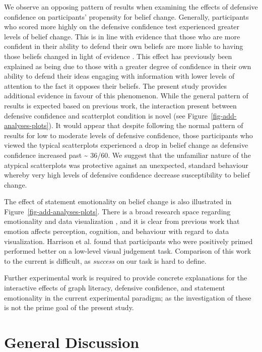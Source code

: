 \documentclass[manuscript,screen,review,anonymous]{acmart}
\begin{document}
We observe an opposing pattern of results when examining the effects of
defensive confidence on participants' propensity for belief change.
Generally, participants who scored more highly on the defensive
confidence test experienced greater levels of belief change. This is in
line with evidence that those who are more confident in their ability to
defend their own beliefs are more liable to having those beliefs changed
in light of evidence \citep{albarracin_2004}. This effect has previously
been explained as being due to those with a greater degree of confidence
in their own ability to defend their ideas engaging with information
with lower levels of attention to the fact it opposes their beliefs. The
present study provides additional evidence in favour of this phenomenon.
While the general pattern of results is expected based on previous work,
the interaction present between defensive confidence and scatterplot
condition is novel (see Figure~\ref{fig-add-analyses-plots}). It would
appear that despite following the normal pattern of results for low to
moderate levels of defensive confidence, those participants who viewed
the typical scatterplots experienced a drop in belief change as
defensive confidence increased past \textasciitilde{} 36/60. We suggest
that the unfamiliar nature of the atypical scatterplots was protective
against an unexpected, standard behaviour whereby very high levels of
defensive confidence decrease susceptibility to belief change.

The effect of statement emotionality on belief change is also
illustrated in Figure~\ref{fig-add-analyses-plots}. There is a broad
research space regarding emotionality and data visualization
\citep{lan_2023}, and it is clear from previous work that emotion
affects perception, cognition, and behaviour
\citep{phelps_2006, harrison_2013, thoresen_2016} with regard to data
visualization. Harrison et al. \citep{harrison_2013} found that
participants who were positively primed performed better on a low-level
visual judgement task. Comparison of this work to the current is
difficult, as \emph{success} on our task is hard to define.

Further experimental work is required to provide concrete explanations
for the interactive effects of graph literacy, defensive confidence, and
statement emotionality in the current experimental paradigm; as the
investigation of these is not the prime goal of the present study.

\section{General Discussion}\label{sec-general-discussion}
\end{document}
